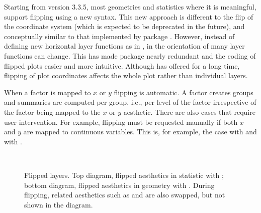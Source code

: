 \documentclass[krantz2]{krantz}\usepackage{knitr}
\begin{document}
Starting from \ggplot version 3.3.5, most geometries and statistics where it is meaningful, support flipping using a new syntax. This new approach is different to the flip of the coordinate system (which is expected to be deprecated in the future), and conceptually similar to that implemented by package . However, instead of defining new horizontal layer functions as in , in \ggplot the orientation of many layer functions can change. This has made package  nearly redundant and the coding of flipped plots easier and more intuitive. Although \ggplot has offered  for a long time, flipping of plot coordinates affects the whole plot rather than individual layers.

When a factor is mapped to $x$ or $y$ flipping is automatic. A factor creates groups and summaries are computed per group, i.e., per level of the factor irrespective of the factor being mapped to the $x$ or $y$ aesthetic. There are also cases that require user intervention. For example, flipping must be requested manually if both $x$ and $y$ are mapped to continuous variables. This is, for example, the case with  and with .

\begin{figure}
  \centering%
  {\sffamily%
\\[2.5ex]
  }
  \caption[Flipped layers diagram]{Flipped layers. Top diagram, flipped aesthetics in statistic with ; bottom diagram, flipped aesthetics in geometry with . During flipping, related aesthetics such as  and  are also swapped, but not shown in the diagram. }\label{fig:plot:flip:stat}
\end{figure}
\end{document}
